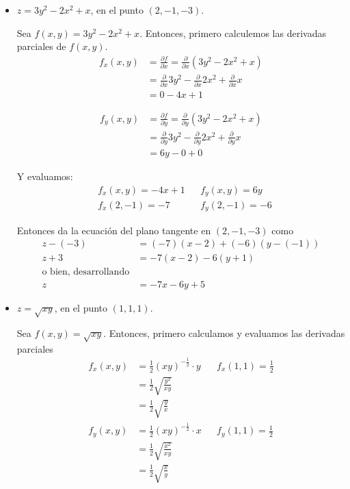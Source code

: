 \documentclass[12pt]{article}
\begin{document}
\begin{itemize}[format=\textbf]
\begin{itemize}[format=\textbf]
\item $z=3y^2-2x^2+x$, en el punto $(2,-1,-3)$.

  Sea $f(x,y)=3y^2-2x^2+x$. Entonces, primero calculemos las derivadas parciales de $f(x,y)$.
  \begin{align*}
    f_x(x,y) &= \frac{\partial f}{\partial x} = \frac{\partial }{\partial x} \left(3y^2-2x^2+x \right) \\
    &=  \frac{\partial }{\partial x}3y^2 - \frac{\partial }{\partial x}2x^2 +\frac{\partial }{\partial x} x\\
    &= 0 - 4x + 1
  \end{align*}

  \begin{align*}
    f_y(x,y) &= \frac{\partial f}{\partial y} = \frac{\partial }{\partial y} \left(3y^2-2x^2+x \right) \\
    &=  \frac{\partial }{\partial y}3y^2 - \frac{\partial }{\partial y}2x^2 +\frac{\partial }{\partial y} x\\
    &= 6y - 0 + 0
  \end{align*}

Y evaluamos:
\begin{align*}
&f_x(x,y)=-4x+1 
&&
f_y(x,y)=6y \\
&f_x(2,-1)=-7
&&
f_y(2,-1)=-6
\end{align*}

Entonces da la ecuación del plano tangente en $(2,-1,-3)$ como
\begin{align*}
z-(-3)&=(-7)(x-2)+(-6)(y-(-1)) \\
z+3&=-7(x-2)-6(y+1) \\
\text{o bien, desarrollando}\\
z&=-7x-6y+5
\end{align*}

\item $z=\sqrt{xy}$, en el punto $(1,1,1)$.

Sea $f(x,y)=\sqrt{xy}$. Entonces, primero calculamos y evaluamos las derivadas parciales
\begin{align*}
  f_x(x,y) &= \frac{1}{2}(xy)^{-\frac{1}{2}} \cdot y
  && f_x(1,1) = \frac{1}{2} \\
&= \frac{1}{2}\sqrt{\frac{y^2}{xy}} \\
&= \frac{1}{2}\sqrt{\frac{y}{x}} \\
  f_y(x,y) &= \frac{1}{2}(xy)^{-\frac{1}{2}} \cdot x
  && f_y(1,1) = \frac{1}{2}\\
&= \frac{1}{2}\sqrt{\frac{x^2}{xy}} \\
&= \frac{1}{2}\sqrt{\frac{x}{y}} 
\end{align*}


\end{itemize}
\end{itemize}
\end{document}
